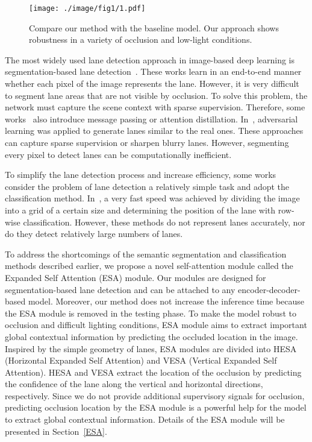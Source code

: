 \documentclass[10pt,twocolumn,letterpaper]{article}
\begin{document}
\begin{figure}
	\setlength{\belowcaptionskip}{-24pt}
	\begin{center}
		\texttt{[image: ./image/fig1/1.pdf]}
		\\[-2ex]
		\caption{Compare our method with the baseline model. Our approach shows robustness in a variety of occlusion and low-light conditions.}
		\label{fig:intro}
	\end{center}
\end{figure}

The most widely used lane detection approach in image-based deep learning is segmentation-based lane detection~\cite{neven2018towards, pan2017spatial, hou2019learning, ghafoorian2018gan, lee2017vpgnet, liu2020lane, chang2019multi, lo2019multi, chen2018efficient}. These works learn in an end-to-end manner whether each pixel of the image represents the lane. However, it is very difficult to segment lane areas that are not visible by occlusion. To solve this problem, the network must capture the scene context with sparse supervision. Therefore, some works~\cite{pan2017spatial, hou2019learning} also introduce message passing or attention distillation. In~\cite{ghafoorian2018gan}, adversarial learning was applied to generate lanes similar to the real ones. These approaches can capture sparse supervision or sharpen blurry lanes. However, segmenting every pixel to detect lanes can be computationally inefficient.

To simplify the lane detection process and increase efficiency, some works \cite{qin2020ultra, yoo2020end, chougule2018reliable} consider the problem of lane detection a relatively simple task and adopt the classification method. In~\cite{qin2020ultra}, a very fast speed was achieved by dividing the image into a grid of a certain size and determining the position of the lane with row-wise classification. However, these methods do not represent lanes accurately, nor do they detect relatively large numbers of lanes.

To address the shortcomings of the semantic segmentation and classification methods described earlier, we propose a novel self-attention module called the Expanded Self Attention (ESA) module. Our modules are designed for segmentation-based lane detection and can be attached to any encoder-decoder-based model. Moreover, our method does not increase the inference time because the ESA module is removed in the testing phase. To make the model robust to occlusion and difficult lighting conditions, ESA module aims to extract important global contextual information by predicting the occluded location in the image. Inspired by the simple geometry of lanes, ESA modules are divided into HESA (Horizontal Expanded Self Attention) and VESA (Vertical Expanded Self Attention). HESA and VESA extract the location of the occlusion by predicting the confidence of the lane along the vertical and horizontal directions, respectively. Since we do not provide additional supervisory signals for occlusion, predicting occlusion location by the ESA module is a powerful help for the model to extract global contextual information. Details of the ESA module will be presented in Section~\ref{ESA}.
\end{document}
